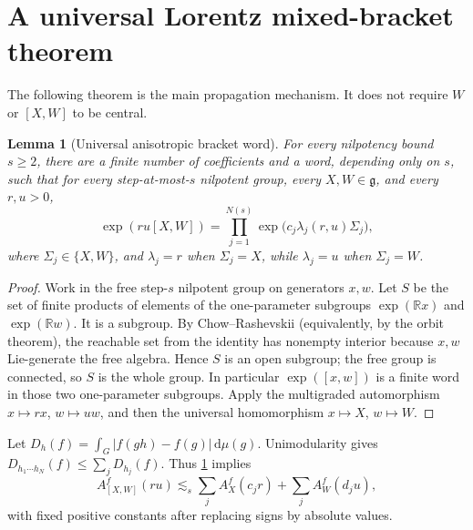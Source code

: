 \documentclass[11pt]{article}
\newtheorem{lemma}[theorem]{Lemma}
\theoremstyle{definition}
\theoremstyle{remark}
\newcommand{\R}{\mathbb R}
\newcommand{\g}{\mathfrak g}
\newcommand{\dd}{\,\mathrm d}
\newcommand{\abs}[1]{\lvert #1\rvert}
\newcommand{\A}[2]{A_{#1}^{#2}}
\newcommand{\less}{\lesssim}
\begin{document}
\section{A universal Lorentz mixed-bracket theorem}\label{sec:mixed}

The following theorem is the main propagation mechanism.  It does not require \(W\) or
\([X,W]\) to be central.

\begin{lemma}[Universal anisotropic bracket word]\label{lem:word}
For every nilpotency bound \(s\ge2\), there are a finite number of coefficients and a word,
depending only on \(s\), such that for every step-at-most-\(s\) nilpotent group, every
\(X,W\in\g\), and every \(r,u>0\),
\begin{equation}\label{eq:word}
 \exp(ru[X,W])=
 \prod_{j=1}^{N(s)}\exp\bigl(c_j\lambda_j(r,u)\Sigma_j\bigr),
\end{equation}
where \(\Sigma_j\in\{X,W\}\), and \(\lambda_j=r\) when \(\Sigma_j=X\), while
\(\lambda_j=u\) when \(\Sigma_j=W\).
\end{lemma}

\begin{proof}
Work in the free step-\(s\) nilpotent group on generators \(x,w\).  Let \(S\) be the
set of finite products of elements of the one-parameter subgroups \(\exp(\R x)\) and
\(\exp(\R w)\).  It is a subgroup.  By Chow--Rashevskii (equivalently, by the orbit
theorem), the reachable set from the identity has nonempty interior because \(x,w\)
Lie-generate the free algebra.  Hence \(S\) is an open subgroup; the free group is
connected, so \(S\) is the whole group.  In particular \(\exp([x,w])\) is a finite word in
those two one-parameter subgroups.  Apply the multigraded automorphism
\(x\mapsto rx\), \(w\mapsto uw\), and then the universal homomorphism
\(x\mapsto X\), \(w\mapsto W\).
\end{proof}

Let \(D_h(f)=\int_G\abs{f(gh)-f(g)}\dd\mu(g)\).  Unimodularity gives
\(D_{h_1\cdots h_N}(f)\le\sum_jD_{h_j}(f)\).  Thus \cref{lem:word} implies
\begin{equation}\label{eq:rectangle}
 \A{[X,W]}{f}(ru)
 \less_s\sum_j\A{X}{f}(c_jr)+\sum_j\A{W}{f}(d_ju),
\end{equation}
with fixed positive constants after replacing signs by absolute values.
\end{document}
